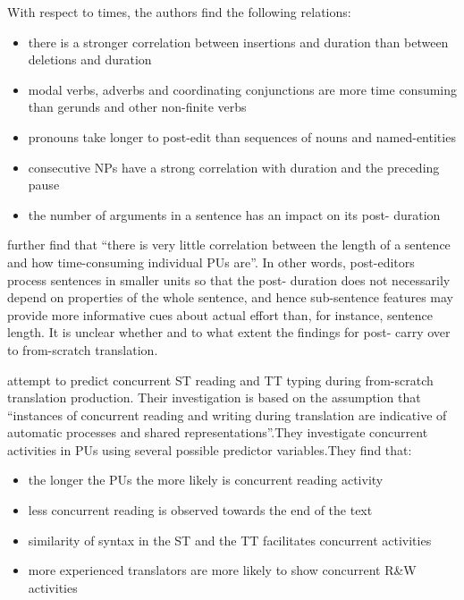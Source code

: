 \documentclass[output=paper]{LSP/langsci}
\begin{document}
With respect to  times, the authors find the following relations:
\begin{itemize}
\item there is a stronger correlation between insertions and duration than between deletions and duration
\item modal verbs, adverbs and coordinating conjunctions are more time consuming than gerunds and other non-finite verbs
\item pronouns take longer to post-edit than sequences of nouns and named-entities
\item consecutive NPs have a strong correlation with  duration and the preceding pause
\item the number of arguments in a sentence has an impact on its post- duration
\end{itemize}

\citep[188]{Aziz2014} further find that ``there is very little correlation between the length of a sentence and how time-consuming individual PUs are''. In other words, post-editors process sentences in smaller units so that the post- duration does not necessarily depend on properties of the whole sentence, and hence sub-sentence features may provide more informative cues about actual  effort than, for instance, sentence length. It is unclear whether and to what extent the findings for post- carry over to from-scratch translation.

\citet[]{Schaeffer2016Language} attempt to predict concurrent ST reading and TT typing during from-scratch translation production. Their investigation is based on the assumption that ``instances of concurrent reading and writing during translation are indicative of automatic processes and shared representations''.They investigate concurrent activities in PUs using several possible predictor variables.They find that:

\begin{itemize}
\item the longer the PUs the more likely is concurrent reading activity
\item less concurrent reading is observed towards the end of the text
\item similarity of syntax in the ST and the TT facilitates concurrent activities
\item more experienced translators are more likely to show concurrent R\&W activities
\end{itemize}
\end{document}
